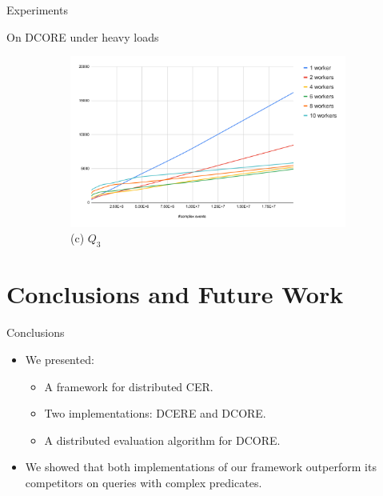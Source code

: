 \documentclass[xcolor=pdftex,dvipsnames,table]{beamer}
\begin{document}
\begin{frame}{Experiments}
\begin{block}{On DCORE under heavy loads}
\begin{figure}[H]
\begin{center}
\begin{subfigure}[b]{0.4\textwidth}
            \includegraphics[width=\textwidth]{experiment_4_chart_3}
            \tiny (c) $Q_{3}$
        \end{subfigure}
        \end{center}
    \end{figure}
  \end{block}
\end{frame}



\section{Conclusions and Future Work}

\begin{frame}{Conclusions}
  \begin{block}{}
   \begin{itemize}
     \item We presented:
        \begin{itemize}
          \item A framework for distributed CER.
          \pause
          \item Two implementations: DCERE and DCORE.
          \pause
          \item A distributed evaluation algorithm for DCORE.
        \end{itemize}
     \pause
     \item We showed that both implementations of our framework outperform its competitors on queries with complex predicates.
   \end{itemize}
  \end{block}
\end{frame}
\end{document}
